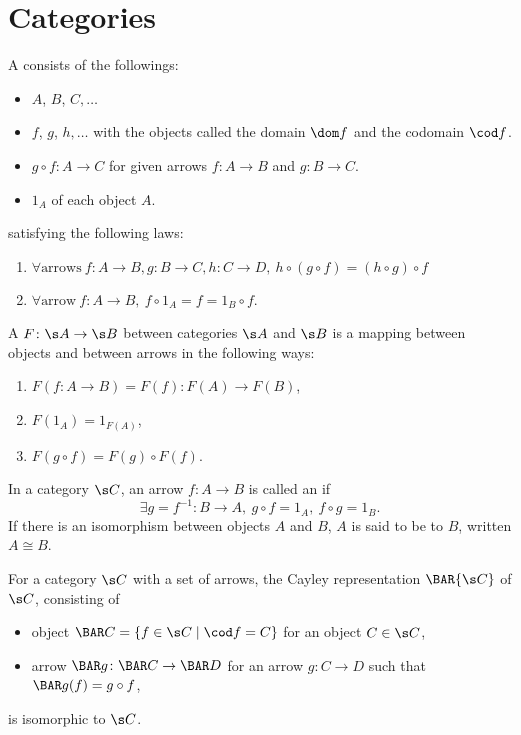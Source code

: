 \newcommand{\sets}{\mathbf{Sets}}
\newcommand{\op}[1]{{#1}^{\mathrm{op}}}
\newcommand{\arr}[1]{{#1}^{\rightarrow}}
\section{Categories}\cite{awodey}
A  consists of the followings:
\begin{itemize}
\item {} $A$, $B$, $C, \dotsc$
\item {} $f$, $g$, $h, \dotsc$ with the objects called the domain $\dom f$ and the codomain $\cod f$.
\item {} $g \circ f \colon A \to C$ for given arrows $f \colon A \to B$ and $g \colon B \to C$.
\item {} $1_A$ of each object $A$.
\end{itemize}
satisfying the following laws:
\begin{enumerate}
\item $\forall \text{arrows}\ f \colon A \to B, g \colon B \to C, h \colon C \to D,\ h \circ (g \circ f) = (h \circ g) \circ f$
\item $\forall \text{arrow}\ f \colon A \to B,\ f \circ 1_A = f = 1_B \circ f$.
\end{enumerate}

A  $F\colon \s A \to \s B$ between categories $\s A$ and $\s B$ is a mapping between objects and between arrows in the following ways:
\begin{enumerate}
\item $F(f\colon A \to B) = F(f) \colon F(A) \to F(B)$,
\item $F(1_A) = 1_{F(A)}$,
\item $F(g \circ f) = F(g) \circ F(f)$.
\end{enumerate}

In a category $\s C$, an arrow $f \colon A \to B$ is called an  if
\[
\exists g = f^{-1} \colon B \to A,\ g \circ f = 1_A,\ f \circ g = 1_B.
\]
If there is an isomorphism between objects $A$ and $B$, $A$ is said to be  to $B$, written $A \cong B$.

For a category $\s C$ with a set of arrows, the Cayley representation $\BAR{\s C}$ of $\s C$, consisting of
\begin{itemize}
  \item object $\BAR C = \{ f \in \s C \mid \cod f = C \}$ for an object $C \in \s C$,
  \item arrow $\BAR g \colon \BAR C \to \BAR D$ for an arrow $g \colon C \to D$ such that $\BAR g (f) = g \circ f$,
\end{itemize}
is isomorphic to $\s C$.

